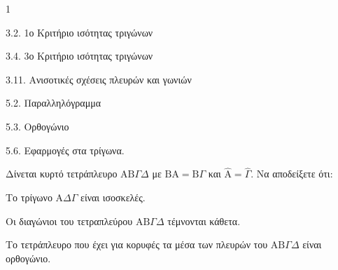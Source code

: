 \begin{ylh}{1}
    \item 3.2. 1ο Κριτήριο ισότητας τριγώνων
    \item 3.4. 3ο Κριτήριο ισότητας τριγώνων
    \item 3.11. Ανισοτικές σχέσεις πλευρών και γωνιών
    \item 5.2. Παραλληλόγραμμα
    \item 5.3. Ορθογώνιο
    \item 5.6. Εφαρμογές στα τρίγωνα.
\end{ylh}
Δίνεται κυρτό τετράπλευρο $\mathrm{A}\mathrm{B}\Gamma\Delta$ με $\mathrm{B}\mathrm{A} = \mathrm{B}\Gamma$ και $\hat{\mathrm{A}} = \hat{\Gamma}$.
Να αποδείξετε ότι:
\begin{alist}
    \item Το τρίγωνο $\mathrm{A}\Delta\Gamma$ είναι ισοσκελές. 
    \item Οι διαγώνιοι του τετραπλεύρου $\mathrm{A}\mathrm{B}\Gamma\Delta$ τέμνονται κάθετα. 
    \item Το τετράπλευρο που έχει για κορυφές τα μέσα των πλευρών του $\mathrm{A}\mathrm{B}\Gamma\Delta$ είναι ορθογώνιο. 
\end{alist}
